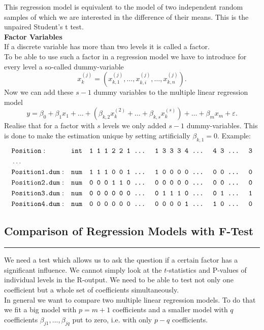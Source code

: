 This regression model is equivalent to the model of two independent random samples of which we are interested in the difference of their means. This is the unpaired Student’s t test.\\

\textbf{Factor Variables}\\
If a discrete variable has more than two levels it is called a factor.\\
To be able to use such a factor in a regression model we have to introduce for every level a so-called dummy-variable
\begin{equation}
  x_k^{(j)} = \left(x_{k,1}^{(j)}, \dots ,x_{k,i}^{(j)}, \dots, x_{k,n}^{(j)}\right).
\end{equation}
Now we can add these $s - 1$ dummy variables to the multiple linear regression model
\begin{equation}
  y = \beta_0 + \beta_1 x_1 + \dots + (\beta_{k,2}x^{(2)}_k + \dots + \beta_{k,s}x^{(s)}_k) + \dots + \beta_m x_m + \varepsilon.
\end{equation}
Realise that for a factor with $s$ levels we only added $s - 1$ dummy-variables. This is done to make the estimation unique by setting artificially $\beta_{k,1} = 0$.
Example:
\begin{align*}
  \scriptstyle
  &\texttt{Position}:      & &\texttt{int}  &\texttt{1 1 1 2 2 1 \dots\; 1 3 3 3 4 \dots\; 4 3 \dots\; 3}\\
  &\dots\\
  &\texttt{Position1.dum}: & &\texttt{num}  &\texttt{1 1 1 0 0 1 \dots\; 1 0 0 0 0 \dots\; 0 0 \dots\; 0}\\
  &\texttt{Position2.dum}: & &\texttt{num}  &\texttt{0 0 0 1 1 0 \dots\; 0 0 0 0 0 \dots\; 0 0 \dots\; 0}\\
  &\texttt{Position3.dum}: & &\texttt{num}  &\texttt{0 0 0 0 0 0 \dots\; 0 1 1 1 0 \dots\; 0 1 \dots\; 1}\\
  &\texttt{Position4.dum}: & &\texttt{num}  &\texttt{0 0 0 0 0 0 \dots\; 0 0 0 0 1 \dots\; 1 0 \dots\; 0}
\end{align*}

\subsection{Comparison of Regression Models with $\mathbf{F}$-Test}
\noindent\rule[\linienAbstand]{\linewidth}{\linienDicke}
We need a test which allows us to ask the question if a certain factor has a significant influence. We cannot simply look at the $t$-statistics and P-values of individual levels in the R-output. We need to be able to test not only one coefficient but a whole set of coefficients simultaneously.\\
In general we want to compare two multiple linear regression models. To do that we fit a big
model with $p = m + 1$ coefficients and a smaller model with $q$ coefficients $\beta_{j1} , . . . , \beta_{jq}$ put to zero, i.e. with only $p - q$ coefficients.\\

